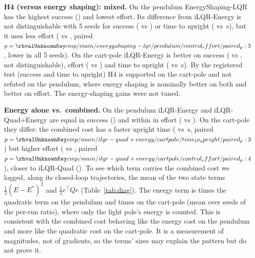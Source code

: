 \textbf{H4 (versus energy shaping): mixed.} On the pendulum EnergyShaping-LQR has the highest success () and lowest effort. Its difference from iLQR-Energy is not distinguishable with 5 seeds for success ( vs ) or time to upright ( vs \,s), but it uses less effort ( vs , paired $p=\rhval{cmp/main/energyshaping-lqr/pendulum/control_effort/paired_p:3}$, lower in all 5 seeds). On the cart-pole iLQR-Energy is better on success ( vs , not distinguishable), effort ( vs ) and time to upright ( vs \,s). By the registered test (success and time to upright) H4 is supported on the cart-pole and not refuted on the pendulum, where energy shaping is nominally better on both and better on effort. The energy-shaping gains were not tuned.

\textbf{Energy alone vs.\ combined.} On the pendulum iLQR-Energy and iLQR-Quad+Energy are equal in success () and within  in effort ( vs ). On the cart-pole they differ: the combined cost has a faster upright time ( vs \,s, paired $p=\rhval{cmp/main/ilqr-quad+energy/cartpole/time_to_upright/paired_p:3}$) but higher effort ( vs , paired $p=\rhval{cmp/main/ilqr-quad+energy/cartpole/control_effort/paired_p:4}$), closer to iLQR-Quad (). To see which term carries the combined cost we logged, along its closed-loop trajectories, the mean of the two state terms $\tfrac12(E-E^{*})^2$ and $\tfrac12 e^\top Q e$ (Table~\ref{tab:diag}). The energy term is  times the quadratic term on the pendulum and  times on the cart-pole (mean over seeds of the per-run ratio), where only the light pole's energy is counted. This is consistent with the combined cost behaving like the energy cost on the pendulum and more like the quadratic cost on the cart-pole. It is a measurement of magnitudes, not of gradients, so the terms' sizes may explain the pattern but do not prove it.

